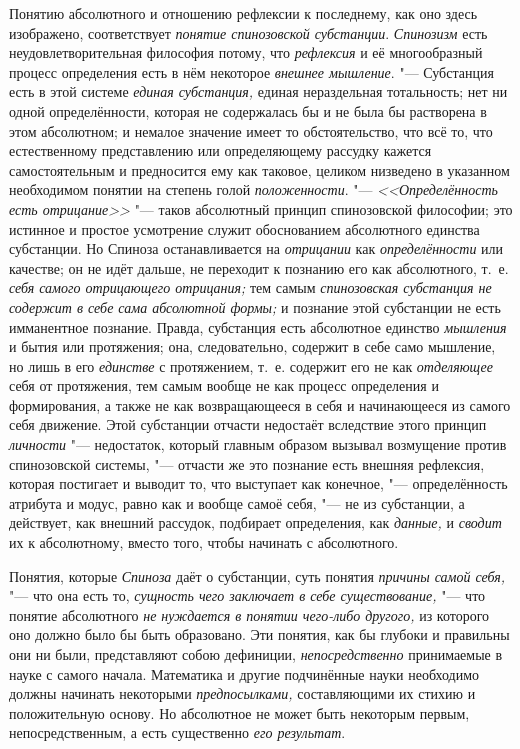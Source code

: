 Понятию абсолютного и отношению рефлексии к последнему, как оно здесь
изображено, соответствует {\em понятие спинозовской
субстанции}. {\em Спинозизм} есть неудовлетворительная
философия потому, что {\em рефлексия} и её
многообразный процесс определения есть в нём некоторое
{\em внешнее мышление}. "--- Субстанция есть в этой
системе {\em единая субстанция,} единая нераздельная
тотальность; нет ни одной определённости, которая не содержалась бы и не
была бы растворена в этом абсолютном; и немалое значение имеет то
обстоятельство, что всё то, что естественному представлению или
определяющему рассудку кажется самостоятельным и предносится ему как
таковое, целиком низведено в указанном необходимом понятии на степень голой
{\em положенности}. "--- {\em <<Определённость есть отрицание>>} "--- таков
абсолютный принцип спинозовской
философии;
это истинное и простое усмотрение служит обоснованием абсолютного единства
субстанции. Но Спиноза останавливается на {\em отрицании} как
{\em определённости} или качестве; он не идёт дальше,
не переходит к познанию его как абсолютного, т.~е.
{\em себя самого отрицающего отрицания;} тем самым
{\em спинозовская субстанция не содержит в себе сама
абсолютной формы;} и познание этой субстанции не есть имманентное познание.
Правда, субстанция есть абсолютное единство
{\em мышления} и бытия или протяжения; она,
следовательно, содержит в себе само мышление, но лишь в его
{\em единстве} с протяжением, т.~е. содержит его не как
{\em отделяющее} себя от протяжения, тем самым вообще
не как процесс определения и формирования, а также не как возвращающееся в
себя и начинающееся из самого себя движение. Этой субстанции отчасти
недостаёт вследствие этого принцип {\em личности}
"--- недостаток, который главным образом вызывал возмущение против
спинозовской системы, "--- отчасти же это познание есть внешняя рефлексия,
которая постигает и выводит то, что выступает как конечное, "---
определённость атрибута и модус, равно как и вообще самоё себя, "--- не из
субстанции, а действует, как внешний рассудок, подбирает определения, как
{\em данные,} и {\em сводит} их к
абсолютному, вместо того, чтобы начинать с абсолютного.

Понятия, которые {\em Спиноза} даёт о субстанции, суть
понятия {\em причины самой себя,} "--- что она есть то,
{\em сущность чего заключает в себе существование,} "---
что понятие абсолютного {\em не нуждается в понятии
чего-либо другого,} из которого оно должно было бы быть образовано. Эти
понятия, как бы глубоки и правильны они ни были, представляют собою
дефиниции, {\em непосредственно} принимаемые в науке с
самого начала. Математика и другие подчинённые науки необходимо должны
начинать некоторыми {\em предпосылками,} составляющими
их стихию и положительную основу. Но абсолютное не может быть некоторым
первым, непосредственным, а есть существенно {\em его
результат}.

